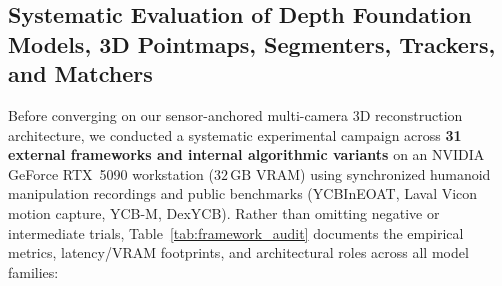 \documentclass[10pt,journal]{IEEEtran}
\begin{document}
\subsection{Systematic Evaluation of Depth Foundation Models, 3D Pointmaps, Segmenters, Trackers, and Matchers}
Before converging on our sensor-anchored multi-camera 3D reconstruction architecture, we conducted a systematic experimental campaign across \textbf{31 external frameworks and internal algorithmic variants} on an NVIDIA GeForce RTX~5090 workstation ($32\,\mathrm{GB}$ VRAM) using synchronized humanoid manipulation recordings and public benchmarks (YCBInEOAT, Laval Vicon motion capture, YCB-M, DexYCB). Rather than omitting negative or intermediate trials, Table~\ref{tab:framework_audit} documents the empirical metrics, latency/VRAM footprints, and architectural roles across all model families:
\end{document}
